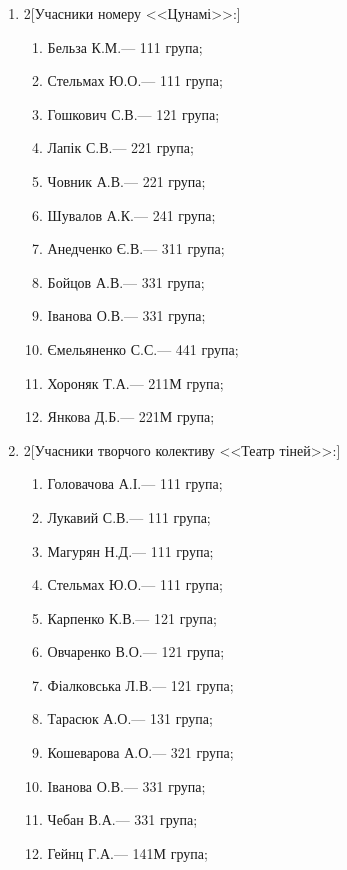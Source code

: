 \documentclass[
	a4paper,
	12pt,
	oneside,
	draft
]{extreport}
\begin{document}
\begin{enumerate}[topsep=0pt,itemsep=-1ex,partopsep=1ex,parsep=1ex]
\item 
\begin{multicols}{2}[Учасники номеру <<Цунамі>>:] 
\begin{enumerate}[topsep=0pt,itemsep=-1ex,partopsep=1ex,parsep=1ex,label=\arabic*.]
\item Бельза К.М.\hfill --- 111 група;
\item Стельмах Ю.О.\hfill --- 111 група;
\item Гошкович С.В.\hfill --- 121 група;
\item Лапік С.В.\hfill --- 221 група;
\item Човник А.В.\hfill --- 221 група;
\item Шувалов А.К.\hfill --- 241 група;
\item Анедченко Є.В.\hfill --- 311 група;
\item Бойцов А.В.\hfill --- 331 група;
\item Іванова О.В.\hfill --- 331 група;
\item Ємельяненко С.С.\hfill --- 441 група;
\item Хороняк Т.А.\hfill --- 211М група;
\item Янкова Д.Б.\hfill --- 221М група;
\end{enumerate}
\end{multicols}

\newpage
\item 
\begin{multicols}{2}[Учасники творчого колективу <<Театр тіней>>:] 
\begin{enumerate}[topsep=0pt,itemsep=-1ex,partopsep=1ex,parsep=1ex,label=\arabic*.]
\item Головачова А.І.\hfill --- 111 група;
\item Лукавий С.В.\hfill --- 111 група;
\item Магурян Н.Д.\hfill --- 111 група;
\item Стельмах Ю.О.\hfill --- 111 група;
\item Карпенко К.В.\hfill --- 121 група;
\item Овчаренко В.О.\hfill --- 121 група;
\item Фіалковська Л.В.\hfill --- 121 група;
\item Тарасюк А.О.\hfill --- 131 група;
\item Кошеварова А.О.\hfill --- 321 група;
\item Іванова О.В.\hfill --- 331 група;
\item Чебан В.А.\hfill --- 331 група;
\item Гейнц Г.А.\hfill --- 141М група;
\end{enumerate}
\end{multicols}


\end{enumerate}
\end{document}
